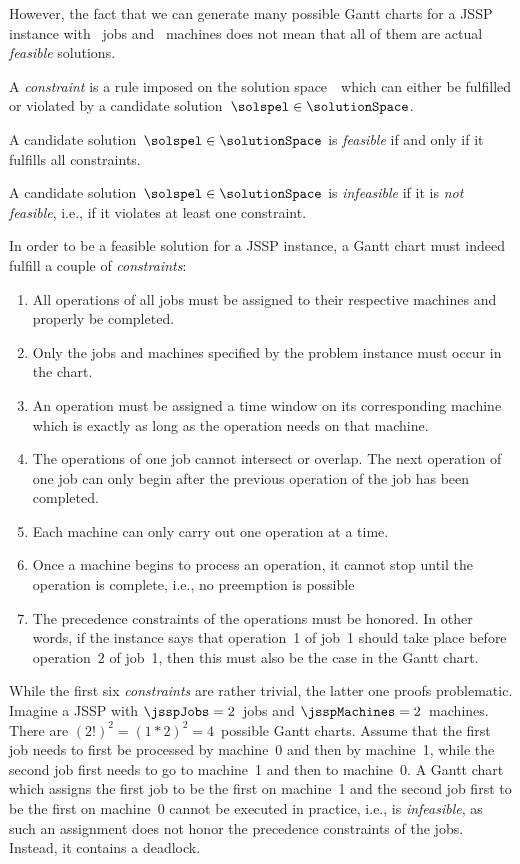 However, the fact that we can generate many possible Gantt charts for a \gls{JSSP} instance with \jsspJobs~jobs and \jsspMachines~machines does not mean that all of them are actual \emph{feasible} solutions.%
\endhsection%
%
%
%
\label{sec:solutionSpace:feasibility}%
%
\begin{definition}%
\label{def:constraint}%
A \emph{constraint} is a rule imposed on the solution space~\solutionSpace\ which can either be fulfilled or violated by a candidate solution~$\solspel\in\solutionSpace$.%
\end{definition}%
%
\begin{definition}%
\label{def:feasibility}%
A candidate solution~$\solspel\in\solutionSpace$ is \emph{feasible} if and only if it fulfills all constraints.%
\end{definition}%
%
\begin{definition}%
\label{def:infeasibility}%
A candidate solution~$\solspel\in\solutionSpace$ is \emph{infeasible} if it is \emph{not feasible}, i.e., if it violates at least one constraint.%
\end{definition}%
%
In order to be a feasible solution for a \gls{JSSP} instance, a Gantt chart must indeed fulfill a couple of \emph{constraints}:%
%
\begin{enumerate}
%
\item All operations of all jobs must be assigned to their respective machines and properly be completed.%
%
\item Only the jobs and machines specified by the problem instance must occur in the chart.%
%
\item An operation must be assigned a time window on its corresponding machine which is exactly as long as the operation needs on that machine.%
%
\item The operations of one job cannot intersect or overlap. %
The next operation of one job can only begin after the previous operation of the job has been completed.%
%
\item Each machine can only carry out one operation at a time.%
%
\item Once a machine begins to process an operation, it cannot stop until the operation is complete, i.e., no preemption is possible%
%
\item The precedence constraints of the operations must be honored. %
In other words, if the instance says that operation~1 of job~1 should take place before operation~2 of job~1, then this must also be the case in the Gantt chart.%
%
\end{enumerate}%
%
While the first six \emph{constraints} are rather trivial, the latter one proofs problematic.
Imagine a \gls{JSSP} with $\jsspJobs=2$~jobs and $\jsspMachines=2$~machines.
There are $(2!)^2=(1*2)^2=4$~possible Gantt charts.
Assume that the first job needs to first be processed by machine~0 and then by machine~1, while the second job first needs to go to machine~1 and then to machine~0.
A Gantt chart which assigns the first job to be the first on machine~1 and the second job first to be the first on machine~$0$ cannot be executed in practice, i.e., is \emph{infeasible}, as such an assignment does not honor the precedence constraints of the jobs.
Instead, it contains a deadlock.

